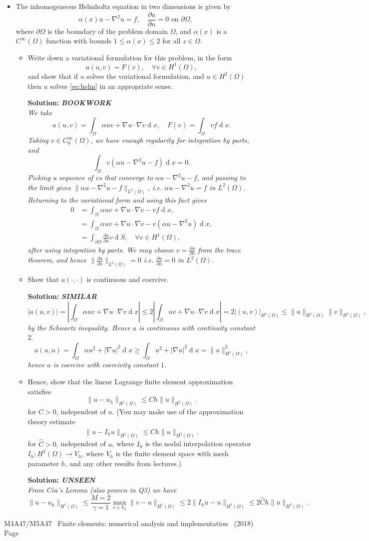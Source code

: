 \documentclass[12pt]{article}
\newcommand{\coursenum}{M4A47/M5A47} %
\newcommand{\coursename}{Finite elements: numerical analysis and implementation} %
\newcommand{\soln}[1]{{\bfseries Solution:} {\itshape \color{blue} #1}}
\newcommand{\soln}[1]{}
\newcommand{\exammarks}[1]{\begin{flushright}[#1 marks]\end{flushright}}%
\DeclareMathOperator{\diff}{d}
\newcommand{\pp}[2]{\frac{\partial #1}{\partial #2}}
\newcommand{\bookwork}{{\bfseries BOOKWORK\\}}
\newcommand{\similar}{{\bfseries SIMILAR\\}}
\newcommand{\unseen}{{\bfseries UNSEEN\\}}
\newcommand{\examyear}{2018}
\newenvironment{Question}[1] 
 {\begin{itemize} \item[\large #1.~~]}{\end{itemize} \medskip}
\newcommand{\EndPage}{
	\vfill \coursenum ~ \coursename ~
	(\examyear) \hfill Page \thepage \newpage
	}
\newcommand{\BeginParts}{\begin{itemize}}
\newcommand{\Part}[1]{\item [(#1)~~]}
\newcommand{\EndParts}{\end{itemize}}
\begin{document}
\begin{Question}{4}
The inhomogeneous Helmholtz equation in two dimensions is given by
\begin{equation}
\alpha(x)u - \nabla^2 u = f, \quad
\pp{u}{n} = 0 \mbox{ on }\partial\Omega,
\label{eq:helm}
\end{equation}
where $\partial\Omega$ is the boundary of the problem domain $\Omega$,
and $\alpha(x)$ is a $C^\infty(\Omega)$ function with bounds $1 \leq
\alpha(x) \leq 2$ for all $z\in \Omega$.
\BeginParts
\Part{a}
Write down a variational formulation for this problem, in the form
\[
a(u, v) = F (v),
\quad \forall v \in H^1(\Omega),
\]
and show that if $u$ solves the variational formulation, and $u\in
H^2(\Omega)$ then $u$ solves \eqref{eq:helm} in an appropriate sense.
\exammarks{6}
\soln{\bookwork
  We take
  \[
  a(u,v) = \int_\Omega \alpha uv + \nabla u\cdot \nabla v \diff x,
  \quad F(v) = \int_\Omega vf\diff x.
  \]
  Taking $v\in C_0^\infty(\Omega)$, we have enough regularity for
  integration by parts, and
  \[
  \int_\Omega v(\alpha u - \nabla^2 u - f)\diff x = 0.
  \]
  Picking a sequence of $v$s that converge to $\alpha u - \nabla^2 u - f$,
  and passing to the limit gives $\|\alpha u - \nabla^2u -f \|_{L^2(\Omega)}$,
  i.e. $\alpha u - \nabla^2u = f$ in $L^2(\Omega)$. Returning to
  the variational form and using this fact gives
  \begin{align*}
    0 & = \int_\Omega \alpha uv + \nabla u\cdot \nabla v - vf\diff x,
    \\ & = \int_\Omega \alpha uv + \nabla u\cdot \nabla v - v(\alpha u
    - \nabla^2 u)\diff x, \\
    & = \int_{\partial\Omega} \pp{u}{n} v \diff S, \quad \forall v \in H^1(\Omega),
  \end{align*}
  after using integration by parts. We may choose $v = \pp{u}{n}$ from
  the trace theorem, and hence $\|\pp{u}{n}\|_{L^2(\Omega)}=0$ i.e.
  $\pp{u}{n}=0$ in $L^2(\Omega)$.
  }
\Part{b} Show that $a(\cdot,\cdot)$ is continuous and coercive.
\exammarks{6}
\soln{\similar
\[
|a(u,v)| = |\int_\Omega \alpha uv + \nabla u\cdot \nabla v \diff x|
\leq 2|\int_\Omega uv + \nabla u\cdot \nabla v \diff x| = 2|(u,v)|_{H^1(\Omega)}
 \leq \|u\|_{H^1(\Omega)}\|v\|_{H^1(\Omega)},
 \]
 by the Schwartz inequality. Hence $a$ is continuous with continuity constant
 $2$.
 \[
 a(u,u) = \int_\Omega \alpha u^2 + |\nabla u|^2 \diff x
 \geq\int_\Omega u^2 + |\nabla u|^2 \diff x
= \|u\|_{H^1(\Omega)}^2,
\]
hence $a$ is coercive with coercivity constant $1$.}
\Part{c} Hence, show that the linear Lagrange finite element approximation
satisfies
\[
\|u-u_h\|_{H^1(\Omega)} \leq Ch\|u\|_{H^2(\Omega)}.
\]
for $C > 0$, independent of $u$. (You may make use of the
approximation theory estimate
\[
\|u-I_hu\|_{H^1(\Omega)} \leq \hat{C}h\|u\|_{H^2(\Omega)}.
\]
for $\hat{C} > 0$, independent of $u$, where $I_h$ is the nodal interpolation
operator $I_h:H^2(\Omega)\to V_h$, where $V_h$ is the finite element space
with mesh parameter $h$, and any other results from lectures.)
\exammarks{8}
\soln{\unseen
  From C\`ea's Lemma (also proven in Q3) we have
  \[
  \|u-u_h\|_{H^1(\Omega)} \leq \frac{M=2}{\gamma=1}\max_{v\in V_h}
  \|v-u\|_{H^1(\Omega)} \leq 2\|I_hu - u \|_{H^1(\Omega)}
  \leq 2\hat{C}h\|u\|_{H^2(\Omega)}.
  \]
  }
\EndParts
\end{Question}
\EndPage
\label{ptotal}
\end{document}
